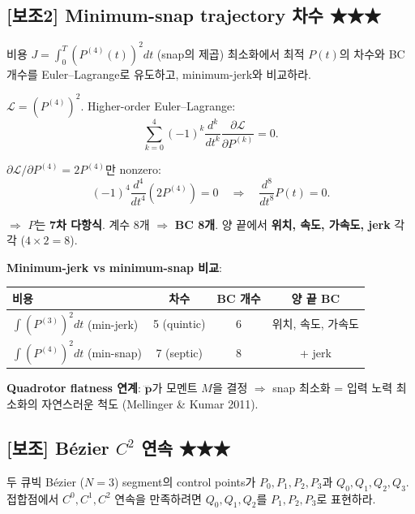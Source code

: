 \documentclass[11pt,a4paper]{article}
\begin{document}
\subsection*{[보조2] Minimum-snap trajectory 차수 \hfill ★★★}

\begin{prob}
비용 $J = \int_0^T (P^{(4)}(t))^2 dt$ (snap의 제곱) 최소화에서 최적 $P(t)$의 차수와 BC 개수를 Euler--Lagrange로 유도하고, minimum-jerk와 비교하라.
\end{prob}

\begin{sol}
$\mathcal{L} = (P^{(4)})^2$. Higher-order Euler--Lagrange:
\[
\sum_{k=0}^4 (-1)^k\frac{d^k}{dt^k}\frac{\partial\mathcal{L}}{\partial P^{(k)}} = 0.
\]

$\partial\mathcal{L}/\partial P^{(4)} = 2 P^{(4)}$만 nonzero:
\[
(-1)^4 \frac{d^4}{dt^4}(2P^{(4)}) = 0 \quad\Rightarrow\quad \frac{d^8}{dt^8}P(t) = 0.
\]

$\Rightarrow$ $P$는 \textbf{7차 다항식}. 계수 8개 $\Rightarrow$ \textbf{BC 8개}. 양 끝에서 \textbf{위치, 속도, 가속도, jerk} 각각 ($4 \times 2 = 8$).

\textbf{Minimum-jerk vs minimum-snap 비교}:

\begin{center}
\begin{tabular}{lccc}
\toprule
비용 & 차수 & BC 개수 & 양 끝 BC \\
\midrule
$\int(P^{(3)})^2 dt$ (min-jerk) & 5 (quintic) & 6 & 위치, 속도, 가속도 \\
$\int(P^{(4)})^2 dt$ (min-snap) & 7 (septic)  & 8 & + jerk \\
\bottomrule
\end{tabular}
\end{center}

\textbf{Quadrotor flatness 연계}: $\ddddot{\mathbf p}$가 모멘트 $M$을 결정 $\Rightarrow$ snap 최소화 = 입력 노력 최소화의 자연스러운 척도 (Mellinger \& Kumar 2011).
\end{sol}

\subsection*{[보조] Bézier $C^2$ 연속 \hfill ★★★}

\begin{prob}
두 큐빅 Bézier ($N = 3$) segment의 control points가 $P_0, P_1, P_2, P_3$과 $Q_0, Q_1, Q_2, Q_3$. 접합점에서 $C^0, C^1, C^2$ 연속을 만족하려면 $Q_0, Q_1, Q_2$를 $P_1, P_2, P_3$로 표현하라.
\end{prob}
\end{document}
